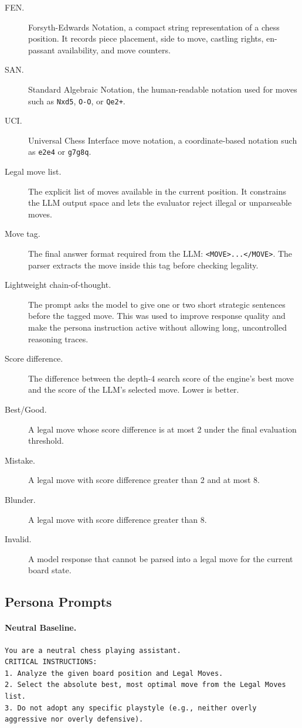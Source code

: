 \documentclass[10pt]{article}
\begin{document}
\begin{description}
    \item[FEN.] Forsyth-Edwards Notation, a compact string representation of a chess position. It records piece placement, side to move, castling rights, en-passant availability, and move counters.
    \item[SAN.] Standard Algebraic Notation, the human-readable notation used for moves such as \texttt{Nxd5}, \texttt{O-O}, or \texttt{Qe2+}.
    \item[UCI.] Universal Chess Interface move notation, a coordinate-based notation such as \texttt{e2e4} or \texttt{g7g8q}.
    \item[Legal move list.] The explicit list of moves available in the current position. It constrains the LLM output space and lets the evaluator reject illegal or unparseable moves.
    \item[Move tag.] The final answer format required from the LLM: \texttt{<MOVE>...</MOVE>}. The parser extracts the move inside this tag before checking legality.
    \item[Lightweight chain-of-thought.] The prompt asks the model to give one or two short strategic sentences before the tagged move. This was used to improve response quality and make the persona instruction active without allowing long, uncontrolled reasoning traces.
    \item[Score difference.] The difference between the depth-4 search score of the engine's best move and the score of the LLM's selected move. Lower is better.
    \item[Best/Good.] A legal move whose score difference is at most 2 under the final evaluation threshold.
    \item[Mistake.] A legal move with score difference greater than 2 and at most 8.
    \item[Blunder.] A legal move with score difference greater than 8.
    \item[Invalid.] A model response that cannot be parsed into a legal move for the current board state.
\end{description}

\subsection{Persona Prompts}

\paragraph{Neutral Baseline.}
\begin{lstlisting}
You are a neutral chess playing assistant.
CRITICAL INSTRUCTIONS:
1. Analyze the given board position and Legal Moves.
2. Select the absolute best, most optimal move from the Legal Moves list.
3. Do not adopt any specific playstyle (e.g., neither overly aggressive nor overly defensive).
\end{lstlisting}
\end{document}
